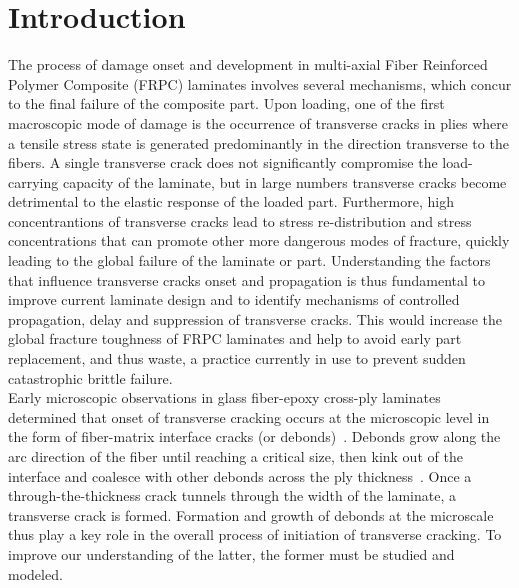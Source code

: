 \documentclass[smallextended]{svjour3}       %
\begin{document}

\section{Introduction}

The process of damage onset and development in multi-axial Fiber Reinforced Polymer Composite (FRPC) laminates involves several mechanisms, which concur to the final failure of the composite part. Upon loading, one of the first macroscopic mode of damage is the occurrence of transverse cracks in plies where a tensile stress state is generated predominantly in the direction transverse to the fibers. A single transverse crack does not significantly compromise the load-carrying capacity of the laminate, but in large numbers transverse cracks become detrimental to the elastic response of the loaded part. Furthermore, high concentrantions of transverse cracks lead to stress re-distribution and stress concentrations that can promote other more dangerous modes of fracture, quickly leading to the global failure of the laminate or part. Understanding the factors that influence transverse cracks onset and propagation is thus fundamental to improve current laminate design and to identify mechanisms of controlled propagation, delay and suppression of transverse cracks. This would increase the global fracture toughness of FRPC laminates and help to avoid early part replacement, and thus waste, a practice currently in use to prevent sudden catastrophic brittle failure.\\
Early microscopic observations in glass fiber-epoxy cross-ply laminates determined that onset of transverse cracking occurs at the microscopic level in the form of fiber-matrix interface cracks (or debonds)~\cite{Bailey1981}. Debonds grow along the arc direction of the fiber until reaching a critical size, then kink out of the interface and coalesce with other debonds across the ply thickness~\cite{Zhang1997}. Once a through-the-thickness crack tunnels through the width of the laminate, a transverse crack is formed. Formation and growth of debonds at the microscale thus play a key role in the overall process of initiation of transverse cracking. To improve our understanding of the latter, the former must be studied and modeled.\\
\end{document}
